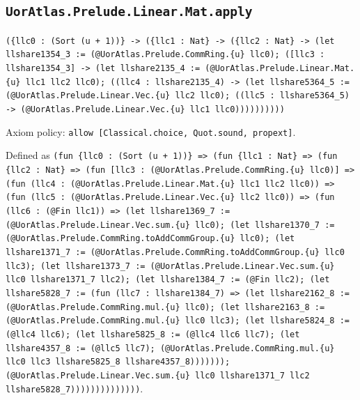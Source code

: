 \documentclass[11pt]{article}
\begin{document}
\subsection*{\texttt{UorAtlas.Prelude.Linear.Mat.apply}}
\noindent\texttt{(\{llc0 : (Sort (u + 1))\} -> (\{llc1 : Nat\} -> (\{llc2 : Nat\} -> (let llshare1354\_3 := (@UorAtlas.Prelude.CommRing.\{u\} llc0); ([llc3 : llshare1354\_3] -> (let llshare2135\_4 := (@UorAtlas.Prelude.Linear.Mat.\{u\} llc1 llc2 llc0); ((llc4 : llshare2135\_4) -> (let llshare5364\_5 := (@UorAtlas.Prelude.Linear.Vec.\{u\} llc2 llc0); ((llc5 : llshare5364\_5) -> (@UorAtlas.Prelude.Linear.Vec.\{u\} llc1 llc0))))))))))}\par
\noindent Axiom policy: \texttt{allow [Classical.choice, Quot.sound, propext]}.\par
\noindent Defined as \texttt{(fun \{llc0 : (Sort (u + 1))\} => (fun \{llc1 : Nat\} => (fun \{llc2 : Nat\} => (fun [llc3 : (@UorAtlas.Prelude.CommRing.\{u\} llc0)] => (fun (llc4 : (@UorAtlas.Prelude.Linear.Mat.\{u\} llc1 llc2 llc0)) => (fun (llc5 : (@UorAtlas.Prelude.Linear.Vec.\{u\} llc2 llc0)) => (fun (llc6 : (@Fin llc1)) => (let llshare1369\_7 := (@UorAtlas.Prelude.Linear.Vec.sum.\{u\} llc0); (let llshare1370\_7 := (@UorAtlas.Prelude.CommRing.toAddCommGroup.\{u\} llc0); (let llshare1371\_7 := (@UorAtlas.Prelude.CommRing.toAddCommGroup.\{u\} llc0 llc3); (let llshare1373\_7 := (@UorAtlas.Prelude.Linear.Vec.sum.\{u\} llc0 llshare1371\_7 llc2); (let llshare1384\_7 := (@Fin llc2); (let llshare5828\_7 := (fun (llc7 : llshare1384\_7) => (let llshare2162\_8 := (@UorAtlas.Prelude.CommRing.mul.\{u\} llc0); (let llshare2163\_8 := (@UorAtlas.Prelude.CommRing.mul.\{u\} llc0 llc3); (let llshare5824\_8 := (@llc4 llc6); (let llshare5825\_8 := (@llc4 llc6 llc7); (let llshare4357\_8 := (@llc5 llc7); (@UorAtlas.Prelude.CommRing.mul.\{u\} llc0 llc3 llshare5825\_8 llshare4357\_8))))))); (@UorAtlas.Prelude.Linear.Vec.sum.\{u\} llc0 llshare1371\_7 llc2 llshare5828\_7))))))))))))))}.\par
\end{document}
